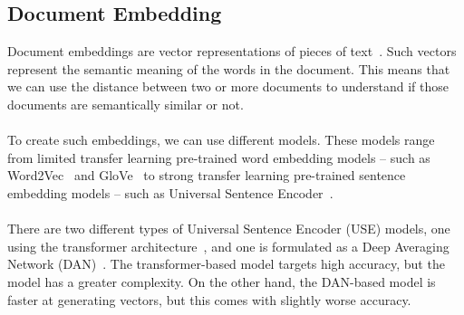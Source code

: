 \subsection{Document Embedding}\label{subsec:document-embedding}
Document embeddings are vector representations of pieces of text~\cite{dai_document_2015}.
Such vectors represent the semantic meaning of the words in the document.
This means that we can use the distance between two or more documents to understand if those documents are semantically similar or not. \\ \\
To create such embeddings, we can use different models.
These models range from limited transfer learning pre-trained word embedding models -- such as Word2Vec~\cite{mikolov_distributed_2013} and GloVe~\cite{pennington_glove_2014} to strong transfer learning pre-trained sentence embedding models -- such as Universal Sentence Encoder~\cite{cer_universal_2018}. \\ \\
There are two different types of Universal Sentence Encoder (USE) models, one using the transformer architecture~\cite{vaswani_attention_2017}, and one is formulated as a Deep Averaging Network (DAN)~\cite{iyyer_deep_2015}.
The transformer-based model targets high accuracy, but the model has a greater complexity.
On the other hand, the DAN-based model is faster at generating vectors, but this comes with slightly worse accuracy.